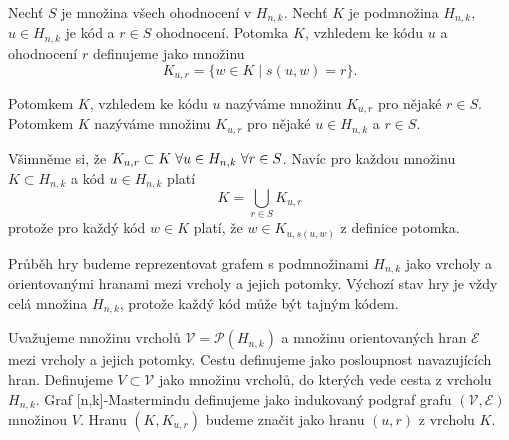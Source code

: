 \begin{definice}[Potomek]\label{potomek}
  Nechť $S$ je množina všech ohodnocení v $H_{n,k}$. Nechť $K$ je podmnožina $H_{n,k}$, $ u \in H_{n,k}$ je kód a $r \in S$ ohodnocení. Potomka $K$, vzhledem ke kódu $u$ a ohodnocení $r$ definujeme jako množinu 
  \[K_{u,r} = \{w \in K \mid s(u,w) = r\}.\] 
\end{definice}

\begin{pozn}
    Potomkem $K$, vzhledem ke kódu $u$ nazýváme množinu $K_{u,r}$ pro nějaké $r \in S$. Potomkem $K$ nazýváme množinu $K_{u,r}$ pro nějaké $u\in H_{n,k}$ a $r \in S$. 
\end{pozn}

\begin{pozn}
    Všimněme si, že $K_{u,r} \subset K \hspace{3px}\forall u\in H_{n,k} \hspace{3px}\forall r\in S$. Navíc pro každou množinu $K \subset H_{n,k}$ a kód $u \in H_{n,k}$ platí
    \[K = \bigcup_{r\in S} K_{u,r}\]
    protože pro každý kód $w \in K$ platí, že $w \in K_{u, s(u,w)}$ z definice potomka.
\end{pozn}



Průběh hry budeme reprezentovat grafem s podmnožinami $H_{n,k}$ jako vrcholy a orientovanými hranami mezi vrcholy a jejich potomky. Výchozí stav hry je vždy celá množina $H_{n,k}$, protože každý kód může být tajným kódem. 

\begin{definice}
  Uvažujeme množinu vrcholů $\mathcal{V} = \mathcal{P}(H_{n,k})$ a množinu orientovaných hran $\mathcal{E}$ mezi vrcholy a jejich potomky. Cestu definujeme jako posloupnost navazujících hran. Definujeme $V \subset \mathcal{V}$ jako množinu vrcholů, do kterých vede cesta z vrcholu $H_{n,k}$. Graf [n,k]-Mastermindu definujeme jako indukovaný podgraf grafu $(\mathcal{V}, \mathcal{E})$ množinou $V$. Hranu $(K, K_{u,r})$ budeme značit jako hranu $(u,r)$ z vrcholu $K$.
\end{definice}
 
